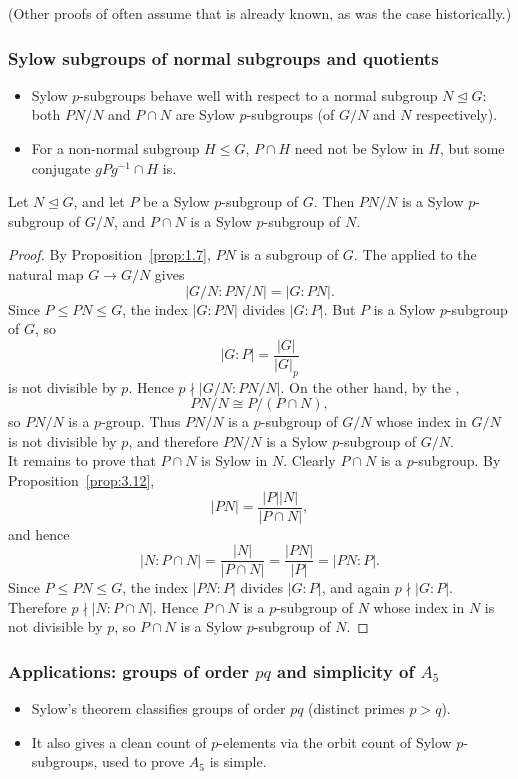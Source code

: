 \documentclass[../Odyssey_Project.tex]{subfiles}
\begin{document}
\noindent (Other proofs of  often assume that  is already known, as was the case historically.)

\subsubsection*{Sylow subgroups of normal subgroups and quotients}
\begin{itemize}
    \item Sylow $p$-subgroups behave well with respect to a normal subgroup $N \trianglelefteq G$: both $PN/N$ and $P \cap N$ are Sylow $p$-subgroups (of $G/N$ and $N$ respectively).
    \item For a non-normal subgroup $H \leq G$, $P \cap H$ need not be Sylow in $H$, but some conjugate $gPg^{-1} \cap H$ is.
\end{itemize}

\begin{proposition}
\label{prop:7.2}
Let $N \trianglelefteq G$, and let $P$ be a Sylow $p$-subgroup of $G$. Then $PN/N$ is a Sylow $p$-subgroup of $G/N$, and $P \cap N$ is a Sylow $p$-subgroup of $N$.
\end{proposition}
\begin{proof}
By Proposition~\ref{prop:1.7}, $PN$ is a subgroup of $G$. The  applied to the natural map $G\to G/N$ gives
\[
    |G/N : PN/N| = |G : PN|.
\]
Since $P \leq PN \leq G$, the index $|G:PN|$ divides $|G:P|$. But $P$ is a Sylow $p$-subgroup of $G$, so
\[
    |G:P|=\frac{|G|}{|G|_p}
\]
is not divisible by $p$. Hence $p\nmid |G/N:PN/N|$. On the other hand, by the ,
\[
    PN/N \cong P/(P\cap N),
\]
so $PN/N$ is a $p$-group. Thus $PN/N$ is a $p$-subgroup of $G/N$ whose index in $G/N$ is not divisible by $p$, and therefore $PN/N$ is a Sylow $p$-subgroup of $G/N$.\\
It remains to prove that $P\cap N$ is Sylow in $N$. Clearly $P\cap N$ is a $p$-subgroup. By Proposition~\ref{prop:3.12},
\[
    |PN|=\frac{|P||N|}{|P\cap N|},
\]
and hence
\[
    |N:P\cap N|=\frac{|N|}{|P\cap N|}=\frac{|PN|}{|P|}=|PN:P|.
\]
Since $P\leq PN\leq G$, the index $|PN:P|$ divides $|G:P|$, and again $p\nmid |G:P|$. Therefore $p\nmid |N:P\cap N|$. Hence $P\cap N$ is a $p$-subgroup of $N$ whose index in $N$ is not divisible by $p$, so $P\cap N$ is a Sylow $p$-subgroup of $N$.
\end{proof}

\subsubsection*{Applications: groups of order $pq$ and simplicity of $A_5$}
\begin{itemize}
    \item Sylow's theorem classifies groups of order $pq$ (distinct primes $p > q$).
    \item It also gives a clean count of $p$-elements via the orbit count of Sylow $p$-subgroups, used to prove $A_5$ is simple.
\end{itemize}
\end{document}
